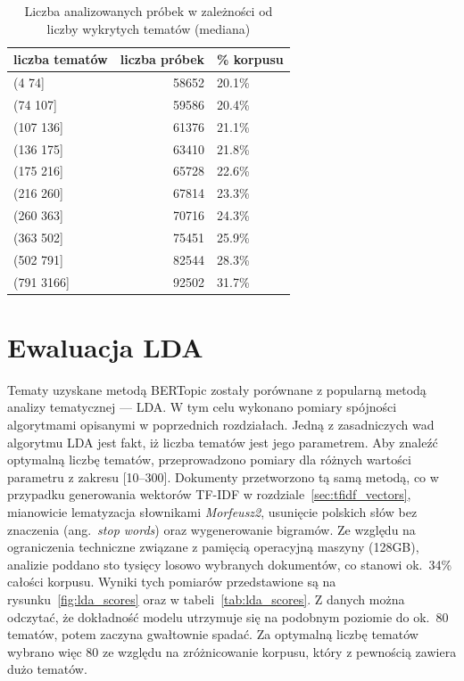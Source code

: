 		\begin{table}[htb]
			\caption{Liczba analizowanych próbek w zależności od liczby wykrytych tematów (mediana)}\label{tab:support}
			\centering
			\begin{tabular}{lrl}
				\toprule
				liczba tematów  &  liczba próbek	&	\% korpusu \\
				\midrule
				(4 74]     &  58652 &	20.1\% \\
				(74 107]   &  59586 &	20.4\% \\
				(107 136]  &  61376 &	21.1\% \\
				(136 175]  &  63410 &	21.8\% \\
				(175 216]  &  65728 &	22.6\% \\
				(216 260]  &  67814 &	23.3\% \\
				(260 363]  &  70716 &	24.3\% \\
				(363 502]  &  75451 &	25.9\% \\
				(502 791]  &  82544 &	28.3\% \\
				(791 3166] &  92502 &	31.7\% \\
				\bottomrule
			\end{tabular}
		\end{table}

\section{Ewaluacja LDA}
	Tematy uzyskane metodą BERTopic zostały porównane z popularną metodą analizy tematycznej --- LDA\@.
	W tym celu wykonano pomiary spójności algorytmami opisanymi w poprzednich rozdziałach.
	Jedną z zasadniczych wad algorytmu LDA jest fakt, iż liczba tematów jest jego parametrem.
	Aby znaleźć optymalną liczbę tematów, przeprowadzono pomiary dla różnych wartości parametru z zakresu [10--300].
	Dokumenty przetworzono tą samą metodą, co w przypadku generowania wektorów TF-IDF w rozdziale~\ref{sec:tfidf_vectors},
		mianowicie lematyzacja słownikami \emph{Morfeusz2}, usunięcie polskich słów bez znaczenia (ang.\ \emph{stop words}) oraz wygenerowanie bigramów.
	Ze względu na ograniczenia techniczne związane z pamięcią operacyjną maszyny (128GB), analizie poddano sto tysięcy losowo wybranych dokumentów,
		co stanowi ok.~34\% całości korpusu.
	Wyniki tych pomiarów przedstawione są na rysunku~\ref{fig:lda_scores} oraz w tabeli~\ref{tab:lda_scores}.
	Z danych można odczytać, że dokładność modelu utrzymuje się na podobnym poziomie do ok.~80 tematów, potem zaczyna gwałtownie spadać.
	Za optymalną liczbę tematów wybrano więc 80 ze względu na zróżnicowanie korpusu, który z pewnością zawiera dużo tematów.

